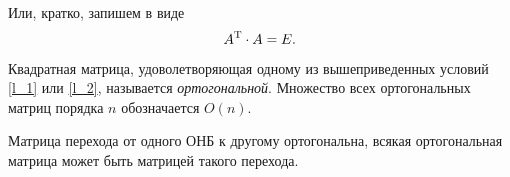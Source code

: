 Или, кратко, запишем в виде
\begin{equation}
\label{l_2}
    A^{\text{T}} \cdot A = E.
\end{equation}

\begin{to_def} 
    Квадратная матрица, удоволетворяющая одному из вышеприведенных условий  \eqref{l_1} или \eqref{l_2}, называется \textit{ортогональной}. Множество всех ортогональных матриц порядка $n$ обозначается $O(n)$. 
\end{to_def}

\begin{to_thr} 
    Матрица перехода от одного ОНБ к другому ортогональна, всякая ортогональная матрица может быть матрицей такого перехода. 
\end{to_thr}




